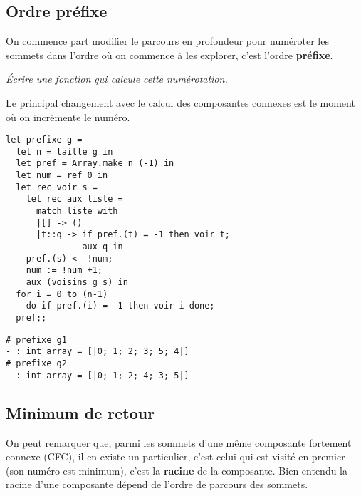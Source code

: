 \subsection{Ordre préfixe} 
On commence part modifier le parcours en profondeur pour numéroter les sommets dans l'ordre où on commence à les explorer, c'est l'ordre {\bf préfixe}.
\begin{Exercise}\it 
Écrire une fonction  qui calcule cette numérotation.
\end{Exercise} 
\begin{Answer}
Le principal changement avec le calcul des composantes connexes est le moment où on incrémente le numéro.
\begin{lstlisting}
let prefixe g = 
  let n = taille g in
  let pref = Array.make n (-1) in
  let num = ref 0 in
  let rec voir s =
    let rec aux liste = 
      match liste with
      |[] -> ()
      |t::q -> if pref.(t) = -1 then voir t;
               aux q in
    pref.(s) <- !num;
    num := !num +1;
    aux (voisins g s) in
  for i = 0 to (n-1) 
    do if pref.(i) = -1 then voir i done;
  pref;;
\end{lstlisting}
\end{Answer} 
\begin{lstlisting}
# prefixe g1
- : int array = [|0; 1; 2; 3; 5; 4|]
# prefixe g2
- : int array = [|0; 1; 2; 4; 3; 5|]
\end{lstlisting}
\subsection{Minimum de retour} 
On peut remarquer que, parmi les sommets d'une même composante fortement connexe (CFC), il en existe un particulier, c'est celui qui est visité en premier (son numéro est minimum), c'est la {\bf racine} de la composante. Bien entendu la racine d'une composante dépend de l'ordre de parcours des sommets. 

